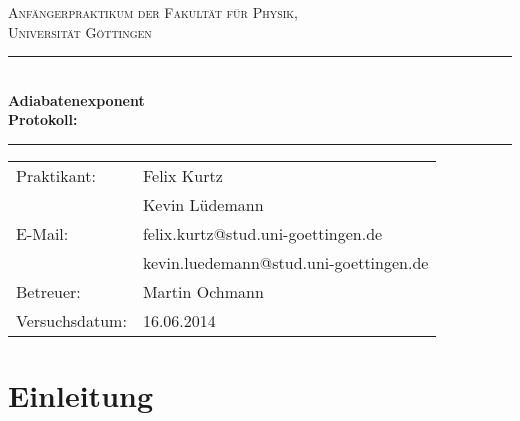 \documentclass[12pt,a4paper,titlepage,headinclude,bibtotoc]{scrartcl}
\begin{document}
\begin{titlepage}
\centering
\textsc{\Large Anfängerpraktikum der Fakultät für
  Physik,\\[1.5ex] Universität Göttingen}

\vspace*{4.2cm}

\rule{\textwidth}{1pt}\\[0.5cm]
{\huge \bfseries
  Adiabatenexponent\\[1.5ex]
  Protokoll:}\\[0.5cm]
\rule{\textwidth}{1pt}

\vspace*{3.0cm}

\begin{Large}
\begin{tabular}{ll}
Praktikant:
 	&  Felix Kurtz\\
	&  Kevin Lüdemann\\

  E-Mail: 
	&  felix.kurtz@stud.uni-goettingen.de\\
	&  kevin.luedemann@stud.uni-goettingen.de\\

 Betreuer: & Martin Ochmann\\
 Versuchsdatum: & 16.06.2014\\
\end{tabular}
\end{Large}

\vspace*{0.8cm}

\begin{Large}
\end{Large}

\end{titlepage}

\tableofcontents

\newpage

\section{Einleitung}
\label{sec:einleitung}
\end{document}

